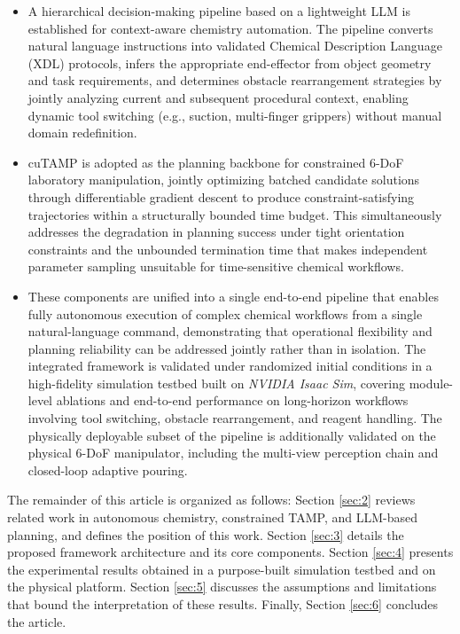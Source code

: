 \documentclass{ieeeaccess}
\newif\ifhighlight
\newcommand{\rev}[1]{\ifhighlight\hl{#1}\else#1\fi}
\begin{document}
\begin{itemize}

\item A hierarchical decision-making pipeline based on a lightweight LLM is established for context-aware chemistry automation. The pipeline converts natural language instructions into validated Chemical Description Language (XDL) protocols, infers the appropriate end-effector from object geometry and task requirements, and determines obstacle rearrangement strategies by jointly analyzing current and subsequent procedural context, enabling dynamic tool switching (e.g., suction, multi-finger grippers) without manual domain redefinition.

\item cuTAMP is adopted as the planning backbone for constrained 6-DoF laboratory manipulation, jointly optimizing batched candidate solutions through differentiable gradient descent to produce constraint-satisfying trajectories within a structurally bounded time budget. This simultaneously addresses the degradation in planning success under tight orientation constraints and the unbounded termination time that makes independent parameter sampling unsuitable for time-sensitive chemical workflows.

\item These components are unified into a single end-to-end pipeline that enables fully autonomous execution of complex chemical workflows from a single natural-language command, demonstrating that operational flexibility and planning reliability can be addressed jointly rather than in isolation. The integrated framework is validated under randomized initial conditions in a high-fidelity simulation testbed built on \textit{NVIDIA Isaac Sim}, covering module-level ablations and end-to-end performance on long-horizon workflows involving tool switching, obstacle rearrangement, and reagent handling.
\rev{The physically deployable subset of the pipeline is additionally validated on the physical 6-DoF manipulator, including the multi-view perception chain and closed-loop adaptive pouring.}

\end{itemize}

The remainder of this article is organized as follows: Section \ref{sec:2} reviews related work in autonomous chemistry, constrained TAMP, and LLM-based planning, and defines the position of this work.
 Section \ref{sec:3} details the proposed framework architecture and its core components. Section \ref{sec:4} presents the experimental results obtained in a purpose-built simulation testbed \rev{and on the physical platform}. Section \ref{sec:5} discusses the assumptions and limitations that bound the interpretation of these results. Finally, Section \ref{sec:6} concludes the article.
\end{document}
